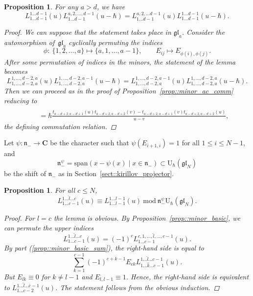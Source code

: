 \documentclass[10pt,a4paper]{article}
\numberwithin{equation}{section}
\newtheorem{Proposition}[Theorem]{Proposition}
{ \theoremstyle{definition}
	\newtheorem{Definition}[Theorem]{Definition}
	\newtheorem{Note}[Theorem]{Note}
	\newtheorem{Example}[Theorem]{Example}
	\newtheorem{Remark}[Theorem]{Remark} }
\newcommand{\C}{\mathbf{C}}
\newcommand{\U}{\mathrm{U}_{\hbar}}
\newcommand{\n}{\mathfrak{n}}
\newcommand{\gl}{\mathfrak{gl}}
\begin{document}
	\begin{Proposition}
		\label{prop::minor_ac2_comm}
		For any $a>d$, we have
		\[
		L_{1\dots d-1}^{1\dots d-1}(u) L_{1\dots d-1}^{a,2,\dots,d-1}(u-\hbar) = L_{1 \dots d-1}^{a,2,\dots d-1}(u) L_{1\dots d-1}^{1\dots d-1}(u-\hbar).
		\]
		\begin{proof}
			We can suppose that the statement takes place in $\gl_a$. Consider the automorphism of~$\gl_a$ cyclically permuting the indices
			\[
			\phi\colon\ \{1,2,\dots,a \} \mapsto \{a,1,\dots,a-1\}, \qquad E_{ij} \mapsto E_{\phi(i),\phi(j)}.
			\]
			After some permutation of indices in the minors, the statement of the lemma becomes
			\[
			L_{1,\dots,d-2,a}^{1,\dots,d-2,a}(u) L_{1,\dots,d-2,a}^{1,\dots,d-2,a-1}(u-\hbar) = L_{1,\dots,d-2,a}^{1,\dots,d-2,a-1}(u) L_{1,\dots,d-2,a}^{1,\dots,d-2,a}(u-\hbar).
			\]
			Then we can proceed as in the proof of Proposition~\ref{prop::minor_ac_comm} reducing to
			\begin{gather*}
				[t_{a-d+2,a-d+2}(u),t_{a-d+1,a-d+2}(v)] \\
				\qquad=\hbar \frac{t_{a-d+2,a-d+1}(u) t_{a-d+2,a-d+2}(v) - t_{a-d+2,a-d+1}(v) t_{a-d+2,a-d+2}(u)}{u-v},
			\end{gather*}
			the defining commutation relation.
		\end{proof}
	\end{Proposition}
	
	Let $\psi\colon \n_- \rightarrow \C$ be the character such that $\psi(E_{i+1,i})=1$ for all $1\leq i \leq N-1$, and
	\[
	\n_-^{\psi} = \mathrm{span}(x - \psi(x)\mid x\in \n_-) \subset \U(\gl_N)
	\]
	be the shift of $\n_-$ as in Section~\ref{sect::kirillov_projector}.
	
	\begin{Proposition}
		\label{prop::minor_quotient}
		For all $c\leq N$,
		\[
		L_{1\dots c-1}^{1\dots \hat{l} \dots c}(u) \equiv L_{1\dots l-1}^{1\dots l-1}(u)\ \mathrm{mod}\ \n_-^{\psi} \U(\gl_N).
		\]
		\begin{proof}
			For $l=c$ the lemma is obvious. By Proposition~\ref{prop::minor_basic}, we can permute the upper indices
			\[
			L_{1\dots c-1}^{1\dots \hat{l} \dots c}(u) = (-1)^{c} L_{1\dots c-1}^{c,1,\dots,\hat{l},\dots, c-1}(u).
			\]
			By part (\ref{prop::minor_basic_sum}), the right-hand side is equal to
			\[
			\sum\limits_{k=1}^{c-1} (-1)^{c+k-1} E_{ck} L_{1\dots \hat{k} \dots c-1}^{1\dots \hat{l} \dots c-1}(u).
			\]
			But $E_{lk} \equiv 0$ for $k\neq l-1$ and $E_{l,l-1} \equiv 1$. Hence, the right-hand side is equivalent to $L_{1\dots c-2}^{1\dots \hat{l} \dots c-1}(u)$. The statement follows from the obvious induction.
		\end{proof}
	\end{Proposition}
	
\end{document}
